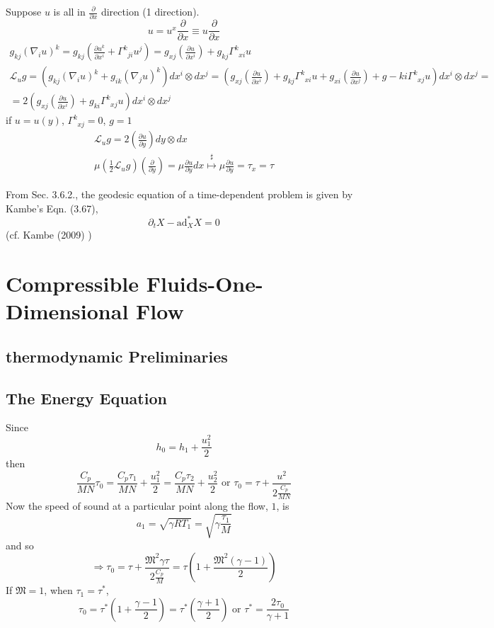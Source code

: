 \documentclass[twoside,landscape,10pt]{amsart}
\theoremstyle{plain}
\theoremstyle{definition}
\theoremstyle{remark}
\theoremstyle{remark}
\begin{document}
\begin{multicols*}{2}
Suppose $u$ is all in $\frac{ \partial }{ \partial x}$ direction (1 direction).  
\[
u = u^x \frac{ \partial }{ \partial x} \equiv u \frac{ \partial }{ \partial x}
\]
\[
\begin{gathered}
  g_{kj} (\nabla_i u)^k = g_{kj} \left( \frac{ \partial u^k}{ \partial x^i} + \Gamma^k_{ \; \; ji} u^j \right) = g_{xj} \left( \frac{ \partial u}{ \partial x^i} \right) + g_{kj} \Gamma^k_{ \; \; xi } u \\
  \mathcal{L}_u g = (g_{kj} (\nabla_i u)^k + g_{ik} (\nabla_j u)^k ) dx^i \otimes dx^j = (g_{xj} \left( \frac{ \partial u}{ \partial x^i} \right) + g_{kj} \Gamma^k_{ \; \; xi} u + g_{xi} \left( \frac{ \partial u }{ \partial x^j} \right) + g-{ki} \Gamma^k_{ \; \; xj} u ) dx^i \otimes dx^j = \\
  = 2 \left( g_{xj} \left( \frac{ \partial u}{ \partial x^i} \right)+ g_{ki} \Gamma^k_{ \; \; xj} u \right) dx^i \otimes dx^j
\end{gathered}
\]
if $u=u(y)$, $\Gamma^k_{ \; \; xj} = 0$, $g=1$
\[
\begin{gathered}
  \mathcal{L}_u g = 2 \left( \frac{ \partial u }{ \partial y} \right) dy \otimes dx \\ 
  \mu\left( \frac{1}{2} \mathcal{L}_u g \right) \left( \frac{ \partial }{ \partial y} \right) = \mu \frac{ \partial u}{ \partial y } dx \overset{\sharp}{\mapsto } \mu \frac{ \partial u}{ \partial y} = \tau_x = \tau
\end{gathered}
\]



From Sec. 3.6.2., the geodesic equation of a time-dependent problem is given by Kambe's Eqn. (3.67), 
\[
\partial_tX - \text{ad}^*_XX = 0 
\]
(cf. Kambe (2009) \cite{TKambe2009})


\section{Compressible Fluids-One-Dimensional Flow}

\subsection{thermodynamic Preliminaries}

\subsection{The Energy Equation}

Since 
\[
h_0 = h_1 + \frac{u_1^2}{2}
\]
then
\[
\frac{C_p}{MN} \tau_0 = \frac{C_p \tau_1}{MN} + \frac{u_1^2}{2} = \frac{C_p \tau_2}{MN} + \frac{u_2^2}{2} \text{ or } \tau_0 = \tau + \frac{u^2}{ 2 \frac{C_p}{MN} }
\]
Now the speed of sound at a particular point along the flow, $1$, is 
\[
a_1 = \sqrt{ \gamma RT_1 } = \sqrt{ \gamma \frac{\tau_1}{M} }
\]
and so 
\[
\Longrightarrow \tau_0 = \tau + \frac{ \mathfrak{M}^2 \gamma \tau }{ 2 \frac{C_p}{M}} = \tau \left( 1 + \frac{ \mathfrak{M}^2 (\gamma-1) }{2} \right)
\]
If $\mathfrak{M}=1$, when $\tau_1=\tau^*$, 
\[
\tau_0 = \tau^* \left( 1 + \frac{\gamma -1}{2} \right) = \tau^* \left( \frac{\gamma + 1 }{2} \right)
\text{ or } \tau^* = \frac{ 2\tau_0 }{ \gamma + 1 } 
\]


\end{multicols*}
\end{document}
